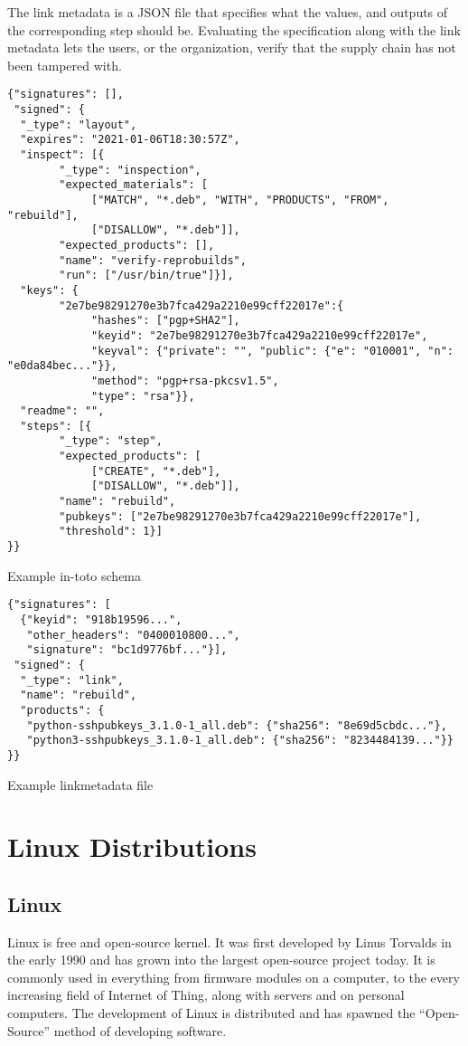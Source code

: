 \documentclass[../Main/thesis.tex]{subfiles}
\begin{document}
The link metadata is a JSON file that specifies what the values, and outputs of
the corresponding step should be. Evaluating the specification along with the
link metadata lets the users, or the organization, verify that the supply chain
has not been tampered with. 

\begin{listing}[H]
\begin{verbatim}
{"signatures": [],
 "signed": {
  "_type": "layout",
  "expires": "2021-01-06T18:30:57Z",
  "inspect": [{
        "_type": "inspection",
        "expected_materials": [
             ["MATCH", "*.deb", "WITH", "PRODUCTS", "FROM", "rebuild"],
             ["DISALLOW", "*.deb"]],
        "expected_products": [],
        "name": "verify-reprobuilds",
        "run": ["/usr/bin/true"]}],
  "keys": {
        "2e7be98291270e3b7fca429a2210e99cff22017e":{
             "hashes": ["pgp+SHA2"],
             "keyid": "2e7be98291270e3b7fca429a2210e99cff22017e",
             "keyval": {"private": "", "public": {"e": "010001", "n": "e0da84bec..."}},
             "method": "pgp+rsa-pkcsv1.5",
             "type": "rsa"}},
  "readme": "",
  "steps": [{
        "_type": "step",
        "expected_products": [
             ["CREATE", "*.deb"],
             ["DISALLOW", "*.deb"]],
        "name": "rebuild",
        "pubkeys": ["2e7be98291270e3b7fca429a2210e99cff22017e"],
        "threshold": 1}]
}}
\end{verbatim}
\caption{Example in-toto schema}
\label{lst:in-toto-schema}
\end{listing}

\begin{listing}[H]
\begin{verbatim}
{"signatures": [
  {"keyid": "918b19596...",
   "other_headers": "0400010800...",
   "signature": "bc1d9776bf..."}],
 "signed": {
  "_type": "link",
  "name": "rebuild",
  "products": {
   "python-sshpubkeys_3.1.0-1_all.deb": {"sha256": "8e69d5cbdc..."},
   "python3-sshpubkeys_3.1.0-1_all.deb": {"sha256": "8234484139..."}}
}}
\end{verbatim}
\caption{Example linkmetadata file}
\label{lst:linkmetadata}
\end{listing}

\section{Linux Distributions}\label{sec:linux_distributions}
\subsection*{Linux}
Linux is free and open-source kernel. It was first developed by Linus Torvalds
in the early 1990 and has grown into the largest open-source project today. It
is commonly used in everything from firmware modules on a computer, to the every
increasing field of Internet of Thing, along with servers and on personal
computers. The development of Linux is distributed and has spawned the
``Open-Source'' method of developing software.
\end{document}
